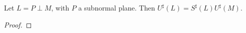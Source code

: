 \begin{lemma}\label{plane}
  Let $L =  P \perp M$, with $P$ a subnormal plane.
  Then $U^\sharp(L) = S^\sharp(L)U^\sharp(M)$.
\end{lemma}
\begin{proof}
%
%



\end{proof}
